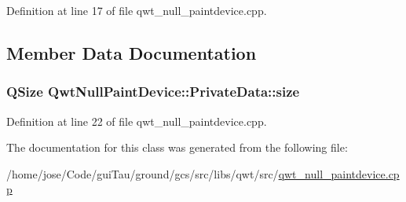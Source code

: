 Definition at line 17 of file qwt\-\_\-null\-\_\-paintdevice.\-cpp.



\subsection{Member Data Documentation}
\hypertarget{class_qwt_null_paint_device_1_1_private_data_a355a1f8c72c60a07d5fbcac27f7a6047}{
\subsubsection[{size}]{\setlength{\rightskip}{0pt plus 5cm}Q\-Size Qwt\-Null\-Paint\-Device\-::\-Private\-Data\-::size}}\label{class_qwt_null_paint_device_1_1_private_data_a355a1f8c72c60a07d5fbcac27f7a6047}


Definition at line 22 of file qwt\-\_\-null\-\_\-paintdevice.\-cpp.



The documentation for this class was generated from the following file\-:\begin{DoxyCompactItemize}
\item 
/home/jose/\-Code/gui\-Tau/ground/gcs/src/libs/qwt/src/\hyperlink{qwt__null__paintdevice_8cpp}{qwt\-\_\-null\-\_\-paintdevice.\-cpp}\end{DoxyCompactItemize}
